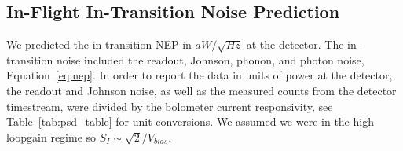 
\subsection{In-Flight In-Transition Noise Prediction}
\label{sec:in_trans_pred}

We predicted the in-transition \ac{NEP} in $aW/\sqrt{Hz}$ at the detector. 
The in-transition noise included the readout, Johnson, phonon, and photon noise, Equation~\ref{eq:nep}. 
In order to report the data in units of power at the detector, the readout and Johnson noise, as well as the measured counts from the detector timestream, were divided by the bolometer current responsivity, see Table~\ref{tab:psd_table} for unit conversions. 
We assumed we were in the high loopgain regime so $S_I \sim \sqrt{2}/V_{bias}$. 

